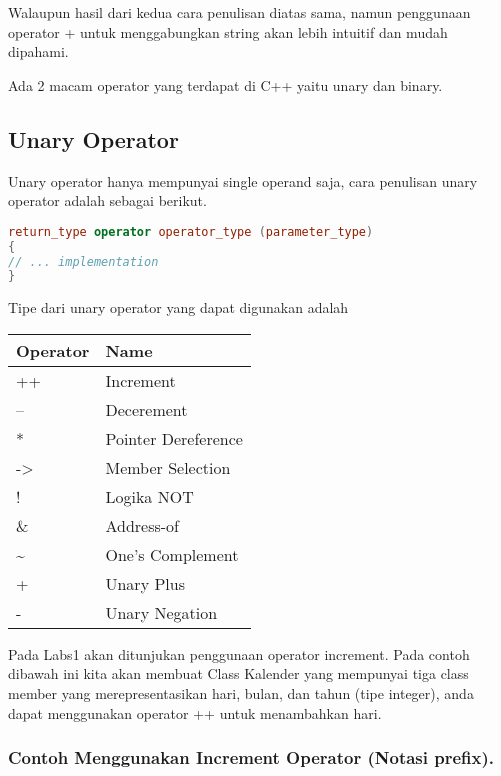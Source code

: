 Walaupun hasil dari kedua cara penulisan diatas sama, namun penggunaan
operator + untuk menggabungkan string akan lebih intuitif dan mudah
dipahami.

Ada 2 macam operator yang terdapat di C++ yaitu unary dan binary.

\subsection{Unary Operator}\label{unary-operator}

Unary operator hanya mempunyai single operand saja, cara penulisan unary
operator adalah sebagai berikut.

\begin{lstlisting}[language=c++, numbers=none]
return_type operator operator_type (parameter_type)
{
// ... implementation
}
\end{lstlisting}

Tipe dari unary operator yang dapat digunakan adalah

\begin{longtable}[]{@{}ll@{}}
\toprule
Operator & Name\tabularnewline
\midrule
\endhead
++ & Increment\tabularnewline
-- & Decerement\tabularnewline
* & Pointer Dereference\tabularnewline
-\textgreater{} & Member Selection\tabularnewline
! & Logika NOT\tabularnewline
\& & Address-of\tabularnewline
\textasciitilde{} & One's Complement\tabularnewline
+ & Unary Plus\tabularnewline
- & Unary Negation\tabularnewline
\bottomrule
\end{longtable}

Pada Labs1 akan ditunjukan penggunaan operator increment. Pada contoh
dibawah ini kita akan membuat Class Kalender yang mempunyai tiga class
member yang merepresentasikan hari, bulan, dan tahun (tipe integer),
anda dapat menggunakan operator ++ untuk menambahkan hari.

\subsubsection*{Contoh  Menggunakan Increment Operator (Notasi prefix).}

